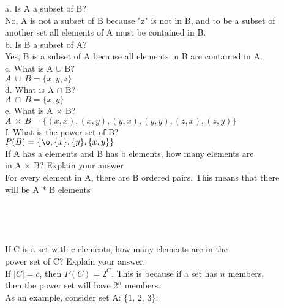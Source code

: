 \documentclass[12pt]{article}
\begin{document}
a. Is A a subset of B? \\
\indent
No, A is not a subset of B because "z" is not in B, and to be a subset of \\
\indent
another set all elements of A must be contained in B. \\

b. Is B a subset of A? \\
\indent
Yes, B is a subset of A because all elements in B are contained in A. \\

c. What is A $\cup$ B? \\
\indent
$ A \ \cup \ B = \{x,y,z\} $ \\

d. What is A $\cap$ B? \\
\indent
$ A \ \cap \ B = \{x,y\} $ \\

e. What is A $\times$ B? \\
\indent
$ A \ \times \ B = \{(x,x),(x,y),(y,x),(y,y),(z,x),(z,y)\} $ \\

f. What is the power set of B? \\
\indent
$ P(B) = \{\o, \{x\}, \{y\}, \{x, y\}\} $ \\

 \quad If A has a elements and B has b elements, how many elements are \\
\indent
\quad in A $\times$ B? Explain your answer \\

\indent
For every element in A, there are B ordered pairs. This means that there \\
\indent
will be A * B elements \\ \\
\\ \\ \\
 \quad If C is a set with c elements, how many elements are in the \\
\indent \quad power set of C? Explain your answer. \\

\indent
If $|C| = c$, then $P(C) = 2^{C}$. This is because if a set has $n$ members, \\
\indent then the power set will have $2^{n}$ members. \\

As an example, consider set A: \{1, 2, 3\}: \\
\end{document}
